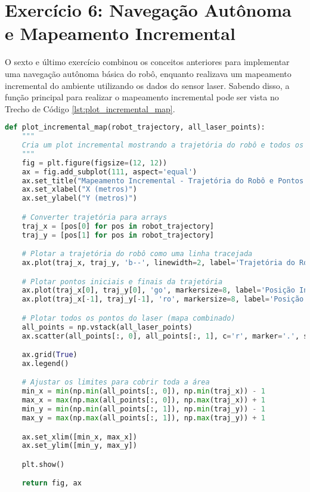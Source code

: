 \section{Exercício 6: Navegação Autônoma e Mapeamento Incremental} \label{sec:ex6}

O sexto e último exercício combinou os conceitos anteriores para implementar uma navegação autônoma básica do robô, enquanto realizava um mapeamento incremental do ambiente utilizando os dados do sensor laser. Sabendo disso, a função principal para realizar o mapeamento incremental pode ser vista no Trecho de Código \ref{lst:plot_incremental_map}.

\begin{lstlisting}[language=Python, caption=Função para plotar mapa incremental., label=lst:plot_incremental_map]
def plot_incremental_map(robot_trajectory, all_laser_points):
    """
    Cria um plot incremental mostrando a trajetória do robô e todos os pontos do laser.
    """
    fig = plt.figure(figsize=(12, 12))
    ax = fig.add_subplot(111, aspect='equal')
    ax.set_title("Mapeamento Incremental - Trajetória do Robô e Pontos do Laser")
    ax.set_xlabel("X (metros)")
    ax.set_ylabel("Y (metros)")

    # Converter trajetória para arrays
    traj_x = [pos[0] for pos in robot_trajectory]
    traj_y = [pos[1] for pos in robot_trajectory]

    # Plotar a trajetória do robô como uma linha tracejada
    ax.plot(traj_x, traj_y, 'b--', linewidth=2, label='Trajetória do Robô')

    # Plotar pontos iniciais e finais da trajetória
    ax.plot(traj_x[0], traj_y[0], 'go', markersize=8, label='Posição Inicial')
    ax.plot(traj_x[-1], traj_y[-1], 'ro', markersize=8, label='Posição Final')

    # Plotar todos os pontos do laser (mapa combinado)
    all_points = np.vstack(all_laser_points)
    ax.scatter(all_points[:, 0], all_points[:, 1], c='r', marker='.', s=2, alpha=0.6, label='Leituras do Laser')

    ax.grid(True)
    ax.legend()

    # Ajustar os limites para cobrir toda a área
    min_x = min(np.min(all_points[:, 0]), np.min(traj_x)) - 1
    max_x = max(np.max(all_points[:, 0]), np.max(traj_x)) + 1
    min_y = min(np.min(all_points[:, 1]), np.min(traj_y)) - 1
    max_y = max(np.max(all_points[:, 1]), np.max(traj_y)) + 1

    ax.set_xlim([min_x, max_x])
    ax.set_ylim([min_y, max_y])

    plt.show()

    return fig, ax
\end{lstlisting}

